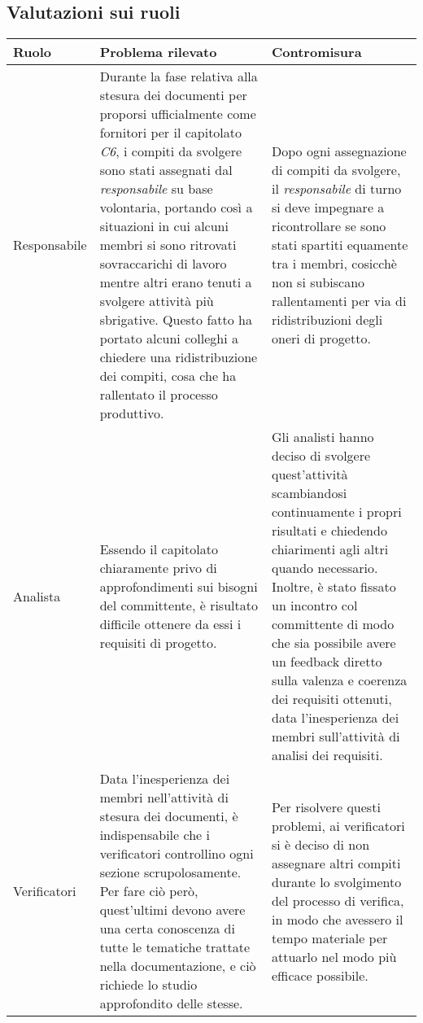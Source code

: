 	\subsection{Valutazioni sui ruoli}
	\begin{center}
	\begin{longtable}{|p{3cm}|p{6cm}|p{6cm}|}
	\hline
	\rowcolor{lighter-grayer}
	\textbf{Ruolo} & \textbf{Problema rilevato} & \textbf{Contromisura}\\
	\hline
	\endfirsthead


	\hline
	Responsabile
	 &
	Durante la fase relativa alla stesura dei documenti per proporsi ufficialmente come fornitori per il capitolato \textit{C6}, i compiti da svolgere sono stati assegnati dal \textit{responsabile} su base volontaria, portando così a situazioni in cui alcuni membri si sono ritrovati sovraccarichi di lavoro mentre altri erano tenuti a svolgere attività più sbrigative. Questo fatto ha portato alcuni colleghi a chiedere una ridistribuzione dei compiti, cosa che ha rallentato il processo produttivo.
	 	&
Dopo ogni assegnazione di compiti da svolgere, il \textit{responsabile} di turno si deve impegnare a ricontrollare se sono stati spartiti equamente tra i membri, cosicchè non si subiscano rallentamenti per via di ridistribuzioni degli oneri di progetto. \\
	\hline

		\hline
	Analista
	 &
	Essendo il capitolato chiaramente privo di approfondimenti sui bisogni del committente, è risultato difficile ottenere da essi i requisiti di progetto.
	 	&
Gli analisti hanno deciso di svolgere quest'attività scambiandosi continuamente i propri risultati e chiedendo chiarimenti agli altri quando necessario. Inoltre, è stato fissato un incontro col committente di modo che sia possibile avere un feedback diretto sulla valenza e coerenza dei requisiti ottenuti, data l'inesperienza dei membri sull'attività di analisi dei requisiti. \\
	\hline

		\hline
	Verificatori
	 &
Data l'inesperienza dei membri nell'attività di stesura dei documenti, è indispensabile che i verificatori controllino ogni sezione scrupolosamente. Per fare ciò però, quest'ultimi devono avere una certa conoscenza di tutte le tematiche trattate nella documentazione, e ciò richiede lo studio approfondito delle stesse.
	 	&
Per risolvere questi problemi, ai verificatori si è deciso di non assegnare altri compiti durante lo svolgimento del processo di verifica, in modo che avessero il tempo materiale per attuarlo nel modo più efficace possibile. \\


\end{longtable}
\end{center}
